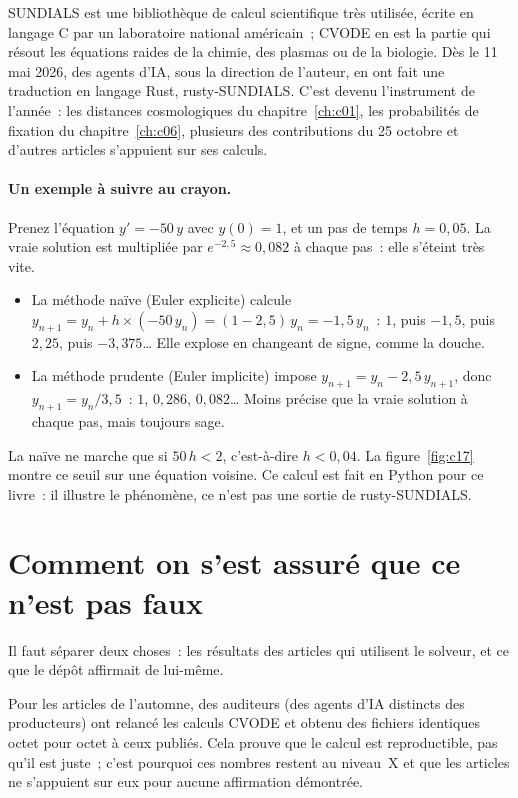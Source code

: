 SUNDIALS est une bibliothèque de calcul scientifique très utilisée, écrite en langage C par un laboratoire national
américain~; CVODE en est la partie qui résout les équations raides de la chimie, des plasmas ou de la biologie.
Dès le 11 mai 2026, des agents d'IA, sous la direction de l'auteur, en ont fait une traduction en langage Rust,
rusty-SUNDIALS. C'est devenu l'instrument de l'année~: les distances cosmologiques du chapitre~\ref{ch:c01}, les probabilités
de fixation du chapitre~\ref{ch:c06}, plusieurs des contributions du 25 octobre et d'autres articles s'appuient sur ses calculs.

\paragraph{Un exemple à suivre au crayon.} Prenez l'équation $y'=-50\,y$ avec $y(0)=1$, et un pas de temps $h=0{,}05$.
La vraie solution est multipliée par $e^{-2{,}5}\approx0{,}082$ à chaque pas~: elle s'éteint très vite.
\begin{itemize}
\item La méthode naïve (Euler explicite) calcule $y_{n+1}=y_n+h\times(-50\,y_n)=(1-2{,}5)\,y_n=-1{,}5\,y_n$~:
  $1$, puis $-1{,}5$, puis $2{,}25$, puis $-3{,}375$\ldots{} Elle explose en changeant de signe, comme la douche.
\item La méthode prudente (Euler implicite) impose $y_{n+1}=y_n-2{,}5\,y_{n+1}$, donc $y_{n+1}=y_n/3{,}5$~:
  $1$, $0{,}286$, $0{,}082$\ldots{} Moins précise que la vraie solution à chaque pas, mais toujours sage.
\end{itemize}
La naïve ne marche que si $50\,h<2$, c'est-à-dire $h<0{,}04$. La figure~\ref{fig:c17} montre ce seuil sur une
équation voisine. Ce calcul est fait en Python pour ce livre~: il illustre le phénomène, ce n'est pas une sortie de
rusty-SUNDIALS.

\section*{Comment on s'est assuré que ce n'est pas faux}

Il faut séparer deux choses~: les résultats des articles qui utilisent le solveur, et ce que le dépôt affirmait de
lui-même.

Pour les articles de l'automne, des auditeurs (des agents d'IA distincts des producteurs) ont relancé les calculs
CVODE et obtenu des fichiers identiques octet pour octet à ceux publiés. Cela prouve que le calcul est
reproductible, pas qu'il est juste~; c'est pourquoi ces nombres restent au niveau~X et que les articles ne
s'appuient sur eux pour aucune affirmation démontrée.

